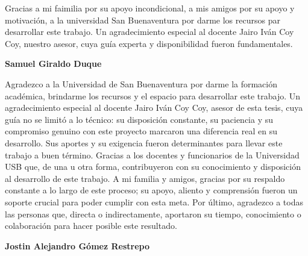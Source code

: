  \vspace{0.7mm}
 
 \begin{center}
     Gracias a mi faimilia por su apoyo incondicional, a mis amigos por su apoyo y motivación, a la universidad San Buenaventura por darme los recursos par desarrollar este trabajo. Un agradecimiento especial al docente Jairo Iván Coy Coy, nuestro asesor, cuya guía experta y disponibilidad fueron fundamentales. \vspace{0.5cm}
 \end{center}
 
 \begin{flushright}
 	\textbf{Samuel Giraldo Duque} \vspace{1cm}
 \end{flushright}
 
 \begin{center}
 	Agradezco a la Universidad de San Buenaventura por darme la formación académica, brindarme los recursos y el espacio para desarrollar este trabajo.
 	Un agradecimiento especial al docente Jairo Iván Coy Coy, asesor de esta tesis, cuya guía no se limitó a lo técnico: su disposición constante, su paciencia y su compromiso genuino con este proyecto marcaron una diferencia real en su desarrollo. Sus aportes y su exigencia fueron determinantes para llevar este trabajo a buen término.
 	Gracias a los docentes y funcionarios de la Universidad USB que, de una u otra forma, contribuyeron con su conocimiento y disposición al desarrollo de este trabajo.
 	A mi familia y amigos, gracias por su respaldo constante a lo largo de este proceso; su apoyo, aliento y comprensión fueron un soporte crucial para poder cumplir con esta meta.
 	Por último, agradezco a todas las personas que, directa o indirectamente, aportaron su tiempo, conocimiento o colaboración para hacer posible este resultado. \vspace{0.5cm}
 \end{center}
 
 \begin{flushright}
 	\textbf{Jostin Alejandro Gómez Restrepo}
 \end{flushright}
 
 

\cleardoublepage{}
